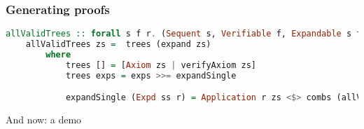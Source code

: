 \documentclass{beamer}
\begin{document}
\begin{frame}[fragile]
    \frametitle{Generating proofs}

    \begin{lstlisting}[language=Haskell]
allValidTrees :: forall s f r. (Sequent s, Verifiable f, Expandable s f r) => s f -> [SequentTree s f r]
    allValidTrees zs =  trees (expand zs)
        where
            trees [] = [Axiom zs | verifyAxiom zs]
            trees exps = exps >>= expandSingle

            expandSingle (Expd ss r) = Application r zs <$> combs (allValidTrees <$> ss)

    \end{lstlisting}

\end{frame}

\begin{frame}[focus]
    And now: a demo
\end{frame}
\end{document}
